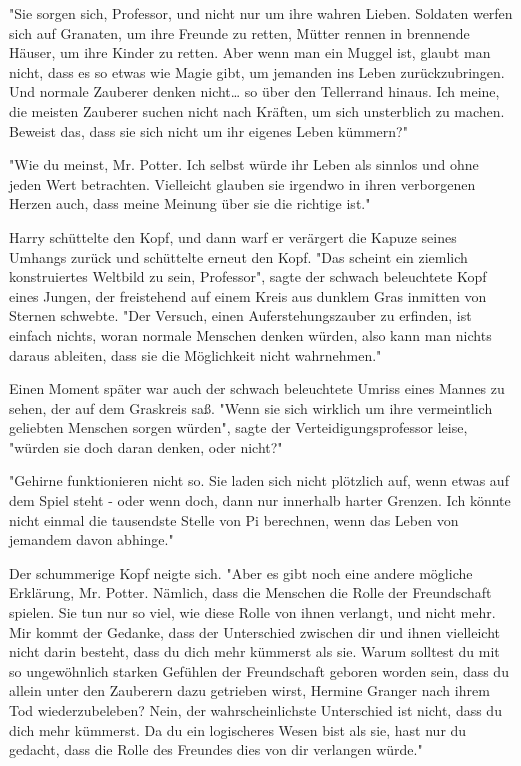 {"Sie sorgen sich, Professor, und nicht nur um ihre wahren Lieben. Soldaten werfen sich auf Granaten, um ihre Freunde zu retten, Mütter rennen in brennende Häuser, um ihre Kinder zu retten. Aber wenn man ein Muggel ist, glaubt man nicht, dass es so etwas wie Magie gibt, um jemanden ins Leben zurückzubringen. Und normale Zauberer denken nicht… so über den Tellerrand hinaus. Ich meine, die meisten Zauberer suchen nicht nach Kräften, um sich unsterblich zu machen. Beweist das, dass sie sich nicht um ihr eigenes Leben kümmern?"

"Wie du meinst, Mr. Potter. Ich selbst würde ihr Leben als sinnlos und ohne jeden Wert betrachten. Vielleicht glauben sie irgendwo in ihren verborgenen Herzen auch, dass meine Meinung über sie die richtige ist."

Harry schüttelte den Kopf, und dann warf er verärgert die Kapuze seines Umhangs zurück und schüttelte erneut den Kopf. "Das scheint ein ziemlich konstruiertes Weltbild zu sein, Professor", sagte der schwach beleuchtete Kopf eines Jungen, der freistehend auf einem Kreis aus dunklem Gras inmitten von Sternen schwebte. "Der Versuch, einen Auferstehungszauber zu erfinden, ist einfach nichts, woran normale Menschen denken würden, also kann man nichts daraus ableiten, dass sie die Möglichkeit nicht wahrnehmen."

Einen Moment später war auch der schwach beleuchtete Umriss eines Mannes zu sehen, der auf dem Graskreis saß. "Wenn sie sich wirklich um ihre vermeintlich geliebten Menschen sorgen würden", sagte der Verteidigungsprofessor leise, "würden sie doch daran denken, oder nicht?"

"Gehirne funktionieren nicht so. Sie laden sich nicht plötzlich auf, wenn etwas auf dem Spiel steht - oder wenn doch, dann nur innerhalb harter Grenzen. Ich könnte nicht einmal die tausendste Stelle von Pi berechnen, wenn das Leben von jemandem davon abhinge."

Der schummerige Kopf neigte sich. "Aber es gibt noch eine andere mögliche Erklärung, Mr. Potter. Nämlich, dass die Menschen die Rolle der Freundschaft spielen. Sie tun nur so viel, wie diese Rolle von ihnen verlangt, und nicht mehr. Mir kommt der Gedanke, dass der Unterschied zwischen dir und ihnen vielleicht nicht darin besteht, dass du dich mehr kümmerst als sie. Warum solltest du mit so ungewöhnlich starken Gefühlen der Freundschaft geboren worden sein, dass du allein unter den Zauberern dazu getrieben wirst, Hermine Granger nach ihrem Tod wiederzubeleben? Nein, der wahrscheinlichste Unterschied ist nicht, dass du dich mehr kümmerst. Da du ein logischeres Wesen bist als sie, hast nur du gedacht, dass die Rolle des Freundes dies von dir verlangen würde."

}
